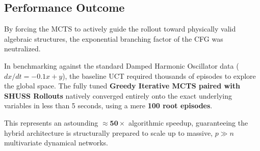 \documentclass[11pt, a4paper]{article}
\begin{document}
\subsection{Performance Outcome}
By forcing the MCTS to actively guide the rollout toward physically valid algebraic structures, the exponential branching factor of the CFG was neutralized. 

In benchmarking against the standard Damped Harmonic Oscillator data ($dx/dt = -0.1x + y$), the baseline UCT required thousands of episodes to explore the global space. The fully tuned \textbf{Greedy Iterative MCTS paired with SHUSS Rollouts} natively converged entirely onto the exact underlying variables in less than 5 seconds, using a mere \textbf{100 root episodes}. 

This represents an astounding $\approx \mathbf{50\times}$ algorithmic speedup, guaranteeing the hybrid architecture is structurally prepared to scale up to massive, $p \gg n$ multivariate dynamical networks.
\end{document}
